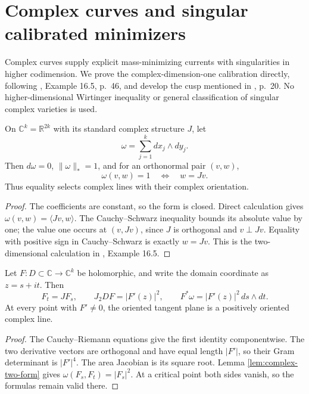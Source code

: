 \chapter{Complex curves and singular calibrated minimizers}\label{sec:calibrated-complex-curves}
Complex curves supply explicit mass-minimizing currents with singularities in higher codimension. We prove the complex-dimension-one calibration directly, following \cite{ChMin}, Example 16.5, p.~46, and develop the cusp mentioned in \cite{Minter}, p.~20. No higher-dimensional Wirtinger inequality or general classification of singular complex varieties is used.

\begin{lemma}\label{lem:complex-two-form}
On $\mathbb C^k=\mathbb R^{2k}$ with its standard complex structure $J$, let
\[
 \omega=\sum_{j=1}^k dx_j\wedge dy_j.
\]
Then $d\omega=0$, $\|\omega\|_*=1$, and for an orthonormal pair $(v,w)$,
\[
 \omega(v,w)=1\quad\Longleftrightarrow\quad w=Jv.
\]
Thus equality selects complex lines with their complex orientation.
\end{lemma}
\begin{proof}
The coefficients are constant, so the form is closed. Direct calculation gives $\omega(v,w)=\langle Jv,w\rangle$. The Cauchy--Schwarz inequality bounds its absolute value by one; the value one occurs at $(v,Jv)$, since $J$ is orthogonal and $v\perp Jv$. Equality with positive sign in Cauchy--Schwarz is exactly $w=Jv$. This is the two-dimensional calculation in \cite{ChMin}, Example 16.5.
\end{proof}

\begin{proposition}\label{prop:holomorphic-area-identity}
Let $F:D\subset\mathbb C\to\mathbb C^k$ be holomorphic, and write the domain coordinate as $z=s+it$. Then
\[
 F_t=JF_s,\qquad J_2DF=|F'(z)|^2,
 \qquad F^*\omega=|F'(z)|^2\,ds\wedge dt.
\]
At every point with $F'\ne0$, the oriented tangent plane is a positively oriented complex line.
\end{proposition}
\begin{proof}
The Cauchy--Riemann equations give the first identity componentwise. The two derivative vectors are orthogonal and have equal length $|F'|$, so their Gram determinant is $|F'|^4$. The area Jacobian is its square root. Lemma \ref{lem:complex-two-form} gives $\omega(F_s,F_t)=|F_s|^2$. At a critical point both sides vanish, so the formulas remain valid there.
\end{proof}

